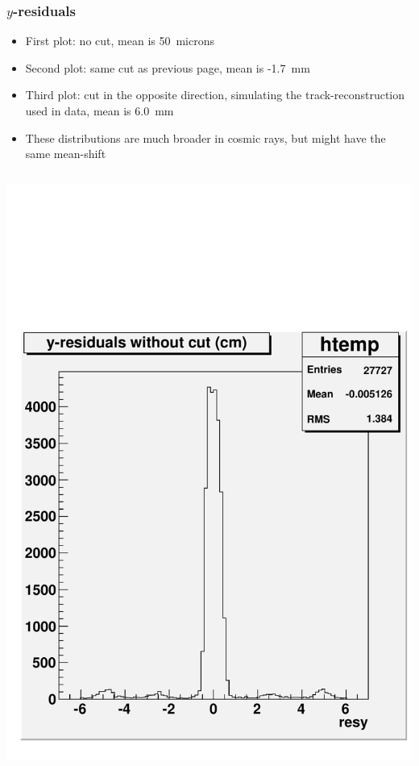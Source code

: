 \documentclass[compress]{beamer}
\begin{document}
\begin{frame}
\frametitle{$y$-residuals}
\scriptsize
\begin{itemize}
\item First plot: no cut, mean is 50~microns
\item Second plot: same cut as previous page, mean is -1.7~mm
\item Third plot: cut in the opposite direction, simulating the track-reconstruction used in data, mean is 6.0~mm
\item These distributions are much broader in cosmic rays, but might have the same mean-shift
\end{itemize}

\vfill
\begin{columns}
\includegraphics[width=\linewidth]{selectioneffect_resid_nocut.pdf}

\end{columns}
\end{frame}
\end{document}
